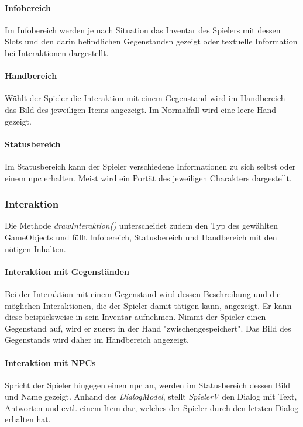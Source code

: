\paragraph{Infobereich}
Im \gls{Infobereich} werden je nach Situation das \gls{Inventar} des \gls{Spieler}s mit dessen Slots 
und den darin befindlichen \glspl{Gegenstand}n gezeigt oder textuelle Information bei Interaktionen 
dargestellt.

\paragraph{Handbereich}
Wählt der \gls{Spieler} die Interaktion mit einem \gls{Gegenstand} wird im \gls{Handbereich} das 
Bild des jeweiligen \gls{Item}s angezeigt. Im Normalfall wird eine leere Hand gezeigt.

\paragraph{Statusbereich}
Im \gls{Statusbereich} kann der \gls{Spieler} verschiedene Informationen zu sich selbst oder einem 
\gls{npc} erhalten. Meist wird ein Portät des jeweiligen Charakters dargestellt.

\subsubsection{Interaktion}
Die Methode \textit{drawInteraktion()} unterscheidet zudem den Typ des gewählten \gls{GameObject}s 
und füllt \gls{Infobereich}, \gls{Statusbereich} und \gls{Handbereich} mit den nötigen Inhalten. 

\paragraph{Interaktion mit Gegenständen}
Bei der Interaktion mit einem \gls{Gegenstand} wird dessen Beschreibung und die möglichen 
Interaktionen, die der \gls{Spieler} damit tätigen kann, angezeigt. Er kann diese beispielsweise 
in sein \gls{Inventar} aufnehmen. Nimmt der \gls{Spieler} einen \gls{Gegenstand} auf, wird er zuerst 
in der Hand "zwischengespeichert". Das Bild des \gls{Gegenstand}s wird daher im \gls{Handbereich} 
angezeigt.

\paragraph{Interaktion mit NPCs}
Spricht der \gls{Spieler} hingegen einen \gls{npc} an, werden im \gls{Statusbereich} dessen Bild und 
Name gezeigt. Anhand des \textit{\gls{Dialog}Model}, stellt \textit{SpielerV} den \gls{Dialog} mit 
Text, Antworten und evtl. einem \gls{Item} dar, welches der \gls{Spieler} durch den letzten 
\gls{Dialog} erhalten hat.

